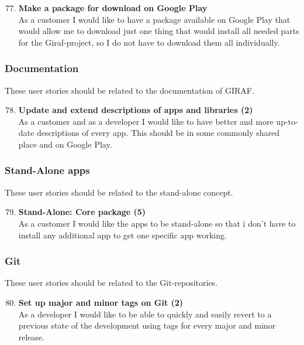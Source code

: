 \begin{enumerate}
	\setcounter{enumi}{76} %
	\item \textbf{Make a package for download on Google Play}\\
	As a customer I would like to have a package available on Google Play that would allow me to download just one thing that would install all needed parts for the Giraf-project, so I do not have to download them all individually.
\end{enumerate}

\subsubsection{Documentation}
These user stories should be related to the documentation of GIRAF.

\begin{enumerate}
	\setcounter{enumi}{77} %
	\item \textbf{Update and extend descriptions of apps and libraries (2)}\\
	As a customer and as a developer I would like to have better and more up-to-date descriptions of every app. This should be in some commonly shared place and on Google Play.
\end{enumerate}

\subsubsection{Stand-Alone apps}
These user stories should be related to the stand-alone concept.

\begin{enumerate}
	\setcounter{enumi}{78} %
	\item \textbf{Stand-Alone: Core package (5)}\\
	As a customer I would like the apps to be stand-alone so that i don't have to install any additional app to get one specific app working.
\end{enumerate}

\subsubsection{Git}
These user stories should be related to the Git-repositories.

\begin{enumerate}
	\setcounter{enumi}{79} %
	\item \textbf{Set up major and minor tags on Git (2)}\\
	As a developer I would like to be able to quickly and easily revert to a previous state of the development using tags for every major and minor release.
\end{enumerate}

